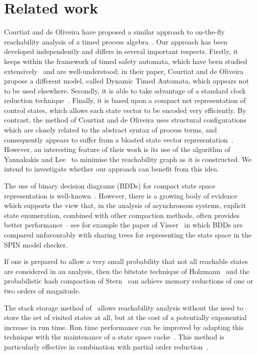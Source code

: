 \section{Related work \label{sec:sgrelated}}
Courtiat and de Oliveira have proposed a similar approach to
on-the-fly reachability analysis of a timed process
algebra~\cite{cd:95}. Our approach has been developed independently
and differs in several important respects. Firstly, it keeps within
the framework of timed safety automata, which have been studied
extensively~\cite{hnsy:94,nsy:91,nsy:92,sok:96,yov:93,yov:97} and are
well-understood; in their paper, Courtiat and de Oliveira propose a
different model, called Dynamic Timed Automata, which appears not to
be used elsewhere. Secondly, it is able to take advantage of a
standard clock reduction technique~\cite{daw:98,dt:98,dy:96,tri:98}.
Finally, it is based upon a compact net representation of control
states, which allows each state vector to be encoded very
efficiently. By contrast, the method of Courtiat and de Oliveira uses
structural configurations which are closely related to the abstract
syntax of process terms, and consequently appears to suffer from a
bloated state vector representation~\cite{acd:97}.  However, an
interesting feature of their work is its use of the algorithm of
Yannakakis and Lee~\cite{yl:93} to minimise the reachability graph as
it is constructed. We intend to investigate whether our approach can benefit
from this idea. 
       
The use of binary decision diagrams (BDDs) for compact state space
representation is well-known~\cite{brb:90,bry:86,bry:92}. However,
there is a growing body of evidence which supports the view that, in
the analysis of asynchronous systems, explicit state enumeration,
combined with other compaction methods, often provides better
performance -- see for example the paper of Visser~\cite{vis:96} in
which BDDs are compared unfavourably with sharing trees for
representing the state space in the SPIN model checker.

If one is prepared to allow a very small probability that not all reachable 
states are considered in an analysis, then the bitstate technique of
Holzmann~\cite{hol:95} and the probabilistic hash compaction of
Stern~\cite{ste:97} can achieve memory reductions of one or two orders
of magnitude. 

The stack storage method of~\cite{hol:90} allows reachability analysis
without the need to store the set of visited states at all, but at the
cost of a potentially exponential increase in run time. Run time
performance can be improved by adapting this technique with the
maintenance of a state space cache~\cite{hol:85,jj:89}. This method is
particularly effective in combination with partial order
reduction~\cite{ghp:95}.


